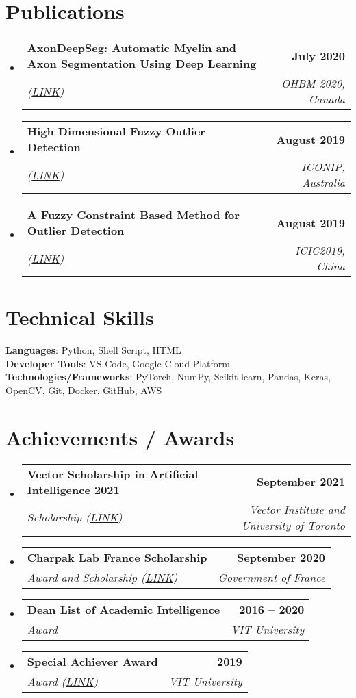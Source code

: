 \documentclass[letterpaper,11pt]{article}
\makeatletter
\newcommand{\resumeSubheading}[4]{
  \vspace{-2pt}\item
    \begin{tabular*}{1.0\textwidth}[t]{l@{\extracolsep{\fill}}r}
      \textbf{#1} & \textbf{\small #2} \\
      \textit{\small#3} & \textit{\small #4} \\
    \end{tabular*}\vspace{-7pt}
}
\newcommand{\resumeSubHeadingListStart}{\begin{itemize}[leftmargin=0.0in, label={}]}
\newcommand{\resumeSubHeadingListEnd}{\end{itemize}}
\makeatother
\begin{document}
\section{Publications}
    \resumeSubHeadingListStart
        \resumeSubheading{AxonDeepSeg: Automatic Myelin and Axon Segmentation Using Deep Learning}{July 2020}{(\href{https://cdn-akamai.6connex.com/645/1827//ohbm2020_boudreau_FINAL_15921677822526191.pdf}{LINK})}{OHBM 2020, Canada}
 
        \resumeSubheading{High Dimensional Fuzzy Outlier Detection}{August 2019}{(\href{http://ajiips.com.au/papers/V16.1/v16n1_49-59.pdf}{LINK})}{ICONIP, Australia}


        \resumeSubheading{A Fuzzy Constraint Based Method for Outlier Detection}{August 2019}{(\href{https://link.springer.com/chapter/10.1007/978-3-030-26766-7_47}{LINK})}{ICIC2019, China}


    \resumeSubHeadingListEnd

\section{Technical Skills}
 \begin{itemize}[leftmargin=0.15in, label={}]
    \small{\item{
     \textbf{Languages}{: Python, Shell Script, HTML} \\
     \textbf{Developer Tools}{: VS Code, Google Cloud Platform} \\
     \textbf{Technologies/Frameworks}{: PyTorch, NumPy, Scikit-learn, Pandas, Keras, OpenCV, Git, Docker, GitHub, AWS} \\
    }}
 \end{itemize}
 \vspace{-16pt}

\section{Achievements / Awards}
    \resumeSubHeadingListStart
        \resumeSubheading{Vector Scholarship in Artificial Intelligence 2021}{September 2021}{Scholarship ({\href{https://vectorinstitute.ai/2021/05/10/newest-vector-ai-scholarship-recipients-join-growing-talent-pool-in-ontario/}{LINK}})}{Vector Institute and University of Toronto}
        \resumeSubheading{Charpak Lab France Scholarship}{September 2020}{Award and Scholarship ({\href{https://www.inde.campusfrance.org/result-of-the-charpak-lab-scholarship-programme-2019}{LINK}})}{Government of France}
        \resumeSubheading{Dean List of Academic Intelligence}{2016 -- 2020}{Award}{VIT University}
        \resumeSubheading{Special Achiever Award}{2019}{Award (\href{https://www2.slideshare.net/secret/9CIVAk7yffpwUx}{LINK})}{VIT University}
    \resumeSubHeadingListEnd
\end{document}
